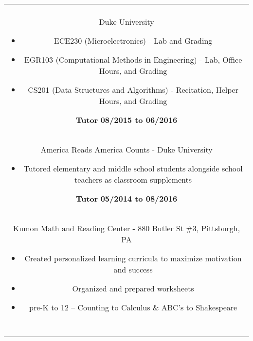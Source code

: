 \documentclass[11pt]{amsart}
\begin{document}
\begin{center}
\begin{tabular}{c}
\begin{minipage}{\textwidth}
		{\bf Teaching Assistant} \hfill {\bf 08/2016 to 12/2016}\\
		{Duke University}
		\begin{itemize}
			\item ECE230 (Microelectronics) - Lab and Grading
			\item EGR103 (Computational Methods in Engineering) - Lab, Office Hours, and Grading
			\item CS201 (Data Structures and Algorithms) - Recitation, Helper Hours, and Grading
		\end{itemize}
		
		{\bf Tutor} \hfill {\bf 08/2015 to 06/2016}\\
		{America Reads America Counts - Duke University}
		\begin{itemize}
			\item Tutored elementary and middle school students alongside school teachers as classroom supplements
		\end{itemize}
		
		{\bf Tutor} \hfill {\bf 05/2014 to 08/2016}\\
		{Kumon Math and Reading Center - 880 Butler St \#3, Pittsburgh, PA}
		\begin{itemize}
			\item Created personalized learning curricula to maximize motivation and success
			\item Organized and prepared worksheets
			\item pre-K to 12 -- Counting to Calculus \& ABC's to Shakespeare
		\end{itemize}
	\end{minipage}\\~\\
	

\end{tabular}
\end{center}
\end{document}
